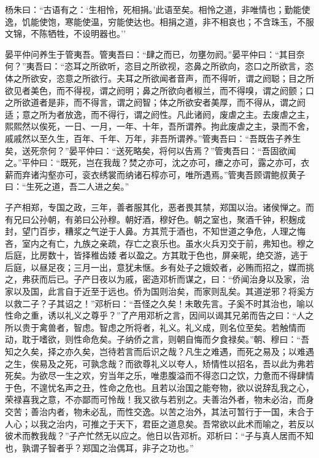 \documentclass[]{article}
\begin{document}
杨朱曰：``古语有之：`生相怜，死相捐。'此语至矣。相怜之道，非唯情也；勤能使逸，饥能使饱，寒能使温，穷能使达也。相捐之道，非不相哀也；不含珠玉，不服文锦，不陈牺牲，不设明器也。''

晏平仲问养生于管夷吾。管夷吾曰：``肆之而已，勿壅勿阏。''晏平仲曰：``其目奈何？''夷吾曰：``恣耳之所欲听，恣目之所欲视，恣鼻之所欲向，恣口之所欲言，恣体之所欲安，恣意之所欲行。夫耳之所欲闻者音声，而不得听，谓之阏聪；目之所欲见者美色，而不得视，谓之阏明；鼻之所欲向者椒兰，而不得嗅，谓之阏颤；口之所欲道者是非，而不得言，谓之阏智；体之所欲安者美厚，而不得从，谓之阏适；意之所为者放逸，而不得行，谓之阏性。凡此诸阏，废虐之主。去废虐之主，熙熙然以俟死，一日、一月，一年、十年，吾所谓养。拘此废虐之主，录而不舍，戚戚然以至久生，百年、千年、万年，非吾所谓养。''管夷吾曰：``吾既告子养生矣，送死奈何？''晏平仲曰：``送死略矣，将何以告焉？''管夷吾曰：``吾固欲闻之。''平仲曰：``既死，岂在我哉？焚之亦可，沈之亦可，瘗之亦可，露之亦可，衣薪而弃诸沟壑亦可，衮衣绣裳而纳诸石椁亦可，唯所遇焉。''管夷吾顾谓鲍叔黄子曰：``生死之道，吾二人进之矣。''

子产相郑，专国之政，三年，善者服其化，恶者畏其禁，郑国以治。诸侯惮之。而有兄曰公孙朝，有弟曰公孙穆。朝好酒，穆好色。朝之室也，聚酒千钟，积麹成封，望门百步，糟浆之气逆于人鼻。方其荒于酒也，不知世道之争危，人理之悔吝，室内之有亡，九族之亲疏，存亡之哀乐也。虽水火兵刃交于前，弗知也。穆之后庭，比房数十，皆择稚齿婑者以盈之。方其耽于色也，屏亲昵，绝交游，逃于后庭，以昼足夜；三月一出，意犹未惬。乡有处子之娥姣者，必贿而招之，媒而挑之，弗获而后已。子产日夜以为戚，密造邓析而谋之，曰：``侨闻治身以及家，治家以及国，此言自于近至于远也。侨为国则治矣，而家则乱矣。其道逆邪？将奚方以救二子？子其诏之！''邓析曰：``吾怪之久矣！未敢先言。子奚不时其治也，喻以性命之重，诱以礼义之尊乎？''了产用邓析之言，因间以谒其兄弟而告之曰：``人之所以贵于禽兽者，智虑。智虑之所将者，礼义。礼义成，则名位至矣。若触情而动，耽于嗜欲，则性命危矣。子纳侨之言，则朝自悔而夕食禄矣。''朝、穆曰：``吾知之久矣，择之亦久矣，岂待若言而后识之哉？凡生之难遇，而死之易及；以难遇之生，俟易及之死，可孰念哉？而欲尊礼义以夸人，矫情性以招名，吾以此为弗若死矣。为欲尽一生之欢，穷当年之乐，唯患腹溢而不得恣口之饮，力惫而不得肆情于色，不遑忧名声之丑，性命之危也。且若以治国之能夸物，欲以说辞乱我之心，荣禄喜我之意，不亦鄙而可怜哉！我又欲与若别之。夫善治外者，物未必治，而身交苦；善治内者，物未必乱，而性交逸。以苦之治外，其法可暂行于一国，未合于人心；以我之治内，可推之于天下，君臣之道息矣。吾常欲以此术而喻之，若反以彼术而教我哉？''子产忙然无以应之。他日以告邓析。邓析曰：``子与真人居而不知也，孰谓子智者乎？郑国之治偶耳，非子之功也。''
\end{document}
